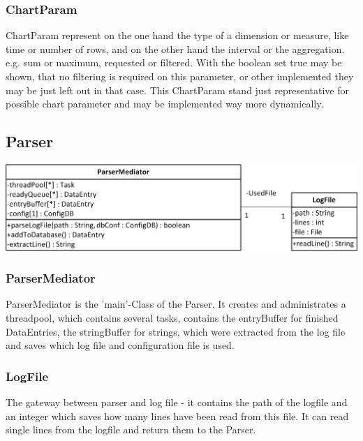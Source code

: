 \subsubsection*{ChartParam} 
ChartParam represent on the one hand the type of a dimension or measure, like time or number of rows, and
on the other hand the interval or the aggregation. e.g. sum or maximum, requested or filtered. 
With the boolean set true may be shown, that no filtering is required on this parameter, or other implemented
they may be just left out in that case. 
This ChartParam stand just representative for possible chart parameter and may be implemented way more dynamically.



\subsection{Parser}

\begin{center}
\includegraphics{Pictures/Parts/ParsMedi.png}
\end{center}  

\subsubsection*{ParserMediator}
ParserMediator is the 'main'-Class of the Parser. It creates and administrates a threadpool,
 which contains several tasks, 
contains the entryBuffer for finished DataEntries, the stringBuffer for strings,
which were extracted from the log file and saves which log file and configuration file is used.

\subsubsection*{LogFile}
The gateway between parser and log file - it contains the path of the logfile and an integer 
which saves how many lines have been read from this file. It can read single lines from the
logfile and return them to the Parser.

